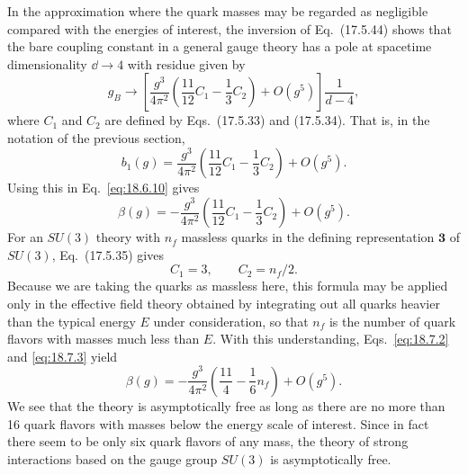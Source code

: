 In the approximation where the quark masses may be regarded as negligible compared with the energies of interest, the inversion of Eq.~(17.5.44) shows that the bare coupling constant in a general gauge theory has a pole at spacetime dimensionality $\dd\to4$ with residue given by
\[
g_B\longrightarrow
\left[
\frac{g^3}{4\pi^2}\left(\frac{11}{12}C_1-\frac{1}{3}C_2\right)
+O(g^5)
\right]\frac{1}{d-4},
\]
where $C_1$ and $C_2$ are defined by Eqs.~(17.5.33) and (17.5.34). That is, in the notation of the previous section,
\begin{equation}
b_1(g)=\frac{g^3}{4\pi^2}\left(\frac{11}{12}C_1-\frac{1}{3}C_2\right)+O(g^5).
\tag{18.7.1}\label{eq:18.7.1}
\end{equation}
Using this in Eq.~\eqref{eq:18.6.10} gives
\begin{equation}
\beta(g)=-\frac{g^3}{4\pi^2}\left(\frac{11}{12}C_1-\frac{1}{3}C_2\right)+O(g^5).
\tag{18.7.2}\label{eq:18.7.2}
\end{equation}
For an $SU(3)$ theory with $n_f$ massless quarks in the defining representation $\mathbf{3}$ of $SU(3)$, Eq.~(17.5.35) gives
\begin{equation}
C_1=3,\qquad C_2=n_f/2.
\tag{18.7.3}\label{eq:18.7.3}
\end{equation}
Because we are taking the quarks as massless here, this formula may be applied only in the effective field theory obtained by integrating out all quarks heavier than the typical energy $E$ under consideration, so that $n_f$ is the number of quark flavors with masses much less than $E$. With this understanding, Eqs.~\eqref{eq:18.7.2} and \eqref{eq:18.7.3} yield
\begin{equation}
\beta(g)=-\frac{g^3}{4\pi^2}\left(\frac{11}{4}-\frac{1}{6}n_f\right)+O(g^5).
\tag{18.7.4}\label{eq:18.7.4}
\end{equation}
We see that the theory is asymptotically free as long as there are no more than 16 quark flavors with masses below the energy scale of interest. Since in fact there seem to be only six quark flavors of any mass, the theory of strong interactions based on the gauge group $SU(3)$ is asymptotically free.

